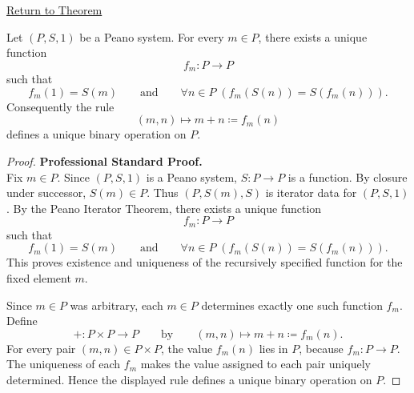 \newpage
{}
\label{prf:addition-well-defined-on-peano-system}

\begin{remark*}[Return]
\hyperref[thm:addition-well-defined-on-peano-system]{Return to Theorem}
\end{remark*}


\begin{theorem*}
Let $(P,S,1)$ be a Peano system. For every $m \in P$, there exists a unique
function
\[
f_m : P \to P
\]
such that
\[
f_m(1)=S(m)
\qquad\text{and}\qquad
\forall n \in P\;(f_m(S(n))=S(f_m(n))).
\]
Consequently the rule
\[
(m,n) \longmapsto m+n \coloneqq f_m(n)
\]
defines a unique binary operation on $P$.
\end{theorem*}

\begin{proof}
\textbf{Professional Standard Proof.}~\\
Fix $m\in P$. Since $(P,S,1)$ is a Peano system, $S:P\to P$ is a function.
By closure under successor, $S(m)\in P$. Thus $(P,S(m),S)$ is iterator data
for $(P,S,1)$. By the Peano Iterator Theorem, there exists a unique function
\[
f_m:P\to P
\]
such that
\[
f_m(1)=S(m)
\qquad\text{and}\qquad
\forall n\in P\;(f_m(S(n))=S(f_m(n))).
\]
This proves existence and uniqueness of the recursively specified function
for the fixed element $m$.

Since $m\in P$ was arbitrary, each $m\in P$ determines exactly one such
function $f_m$. Define
\[
+:P\times P\to P
\qquad\text{by}\qquad
(m,n)\longmapsto m+n\coloneqq f_m(n).
\]
For every pair $(m,n)\in P\times P$, the value $f_m(n)$ lies in $P$, because
$f_m:P\to P$. The uniqueness of each $f_m$ makes the value assigned to each
pair uniquely determined. Hence the displayed rule defines a unique binary
operation on $P$.
\end{proof}

